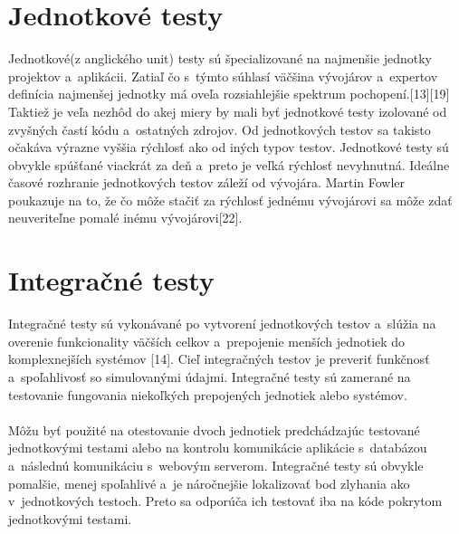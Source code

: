 \documentclass[
  printed, %
  notable,   %
  nolof,     %
    oneside,       %
  nolot,     %
]{fithesis3}
\begin{document}
\section{Jednotkové testy}
Jednotkové(z anglického unit) testy sú špecializované na najmenšie jednotky projektov a~aplikácii. Zatiaľ čo s~týmto súhlasí väčšina vývojárov a~expertov definícia najmenšej jednotky má oveľa rozsiahlejšie spektrum pochopení.[13][19] Taktiež je veľa nezhôd do akej miery by mali byť jednotkové testy izolované od zvyšných častí kódu a~ostatných zdrojov. Od jednotkových testov sa takisto očakáva výrazne vyššia rýchlosť ako od iných typov testov. Jednotkové testy sú obvykle spúšťané viackrát za deň a~preto je veľká rýchlosť nevyhnutná. Ideálne časové rozhranie jednotkových testov záleží od vývojára. Martin Fowler poukazuje na to, že čo môže stačiť za rýchlosť jednému vývojárovi sa môže zdať neuveriteľne pomalé inému vývojárovi[22].
\section{Integračné testy}
Integračné testy sú vykonávané po vytvorení jednotkových testov a~slúžia na overenie funkcionality väčších celkov a~prepojenie menších jednotiek do komplexnejších systémov [14]. Cieľ integračných testov je preveriť funkčnosť a~spoľahlivosť so simulovanými údajmi. Integračné testy sú zamerané na testovanie fungovania niekoľkých prepojených jednotiek alebo systémov.\paragraph{}
Môžu byť použité na otestovanie dvoch jednotiek predchádzajúc testované jednotkovými testami alebo na kontrolu komunikácie aplikácie s~databázou a~následnú komunikáciu s~webovým serverom.  Integračné testy sú obvykle pomalšie, menej spoľahlivé a~je náročnejšie lokalizovať bod zlyhania ako v~jednotkových  testoch. Preto sa odporúča ich testovať iba na kóde pokrytom jednotkovými testami.
\end{document}
